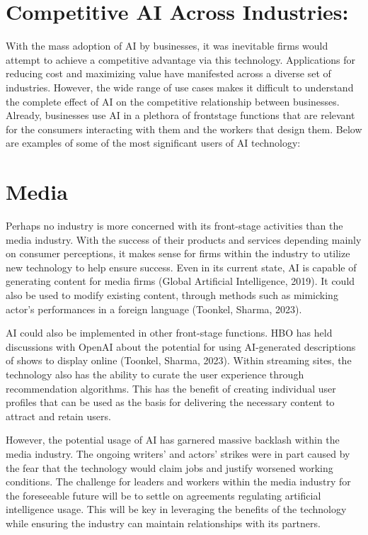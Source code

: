 \documentclass[
]{book}
\begin{document}
\hypertarget{competitive-ai-across-industries}{%
\section{Competitive AI Across Industries:}\label{competitive-ai-across-industries}}

With the mass adoption of AI by businesses, it was inevitable firms would attempt to achieve a competitive advantage via this technology. Applications for reducing cost and maximizing value have manifested across a diverse set of industries. However, the wide range of use cases makes it difficult to understand the complete effect of AI on the competitive relationship between businesses. Already, businesses use AI in a plethora of frontstage functions that are relevant for the consumers interacting with them and the workers that design them. Below are examples of some of the most significant users of AI technology:

\hypertarget{media}{%
\section{Media}\label{media}}

Perhaps no industry is more concerned with its front-stage activities than the media industry. With the success of their products and services depending mainly on consumer perceptions, it makes sense for firms within the industry to utilize new technology to help ensure success. Even in its current state, AI is capable of generating content for media firms (Global Artificial Intelligence, 2019). It could also be used to modify existing content, through methods such as mimicking actor's performances in a foreign language (Toonkel, Sharma, 2023).

AI could also be implemented in other front-stage functions. HBO has held discussions with OpenAI about the potential for using AI-generated descriptions of shows to display online (Toonkel, Sharma, 2023). Within streaming sites, the technology also has the ability to curate the user experience through recommendation algorithms. This has the benefit of creating individual user profiles that can be used as the basis for delivering the necessary content to attract and retain users.

However, the potential usage of AI has garnered massive backlash within the media industry. The ongoing writers' and actors' strikes were in part caused by the fear that the technology would claim jobs and justify worsened working conditions. The challenge for leaders and workers within the media industry for the foreseeable future will be to settle on agreements regulating artificial intelligence usage. This will be key in leveraging the benefits of the technology while ensuring the industry can maintain relationships with its partners.
\end{document}

